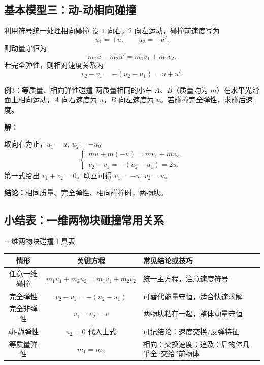 \documentclass[a4paper,11pt]{ctexart}
\begin{document}
\subsection{基本模型三：动-动相向碰撞}

\begin{conceptbox}{利用符号统一处理相向碰撞}
设 $1$ 向右，$2$ 向左运动，碰撞前速度写为
\[
  u_1 = +u,\qquad u_2 = -u'.
\]
则动量守恒为
\[
  m_1u - m_2u' = m_1v_1 + m_2v_2.
\]
若完全弹性，则相对速度关系为
\[
  v_2 - v_1 = -(u_2 - u_1) = u + u' .
\]
\end{conceptbox}

\begin{examplebox}{例3：等质量、相向弹性碰撞}
两质量相同的小车 $A$、$B$（质量均为 $m$）在水平光滑面上相向运动，$A$ 向右速度为 $u$，$B$ 向左速度为 $u$。若碰撞完全弹性，求碰后速度。

\textbf{解：}\par
取向右为正，$u_1 = u,\ u_2 = -u$。
\[
  \begin{cases}
    mu + m(-u) = mv_1 + mv_2,\\[0.3em]
    v_2 - v_1 = -(u_2 - u_1) = 2u.
  \end{cases}
\]
第一式给出 $v_1 + v_2 = 0$。联立可得 $v_1 = -u,\ v_2 = u$。\par
\textbf{结论：}相同质量、完全弹性、相向碰撞时，两物块。
\end{examplebox}

\subsection{小结表：一维两物块碰撞常用关系}

\begin{summarybox}{一维两物块碰撞工具表}
\begin{center}
\begin{tabular}{ccl}
\hline
情形 & 关键方程 & 常见结论或技巧 \\
\hline
任意一维碰撞 &
$m_1u_1 + m_2u_2 = m_1v_1 + m_2v_2$ &
统一主方程，注意速度符号 \\
完全弹性 &
$v_2 - v_1 = -(u_2 - u_1)$ &
可替代能量守恒，适合快速求解 \\
完全非弹性 &
$v_1 = v_2 = v$ &
两物块粘在一起，整体动量守恒 \\
动-静弹性 &
$u_2=0$ 代入上式 &
可记结论：速度交换/反弹特征 \\
等质量弹性 &
$m_1 = m_2$ &
相向：交换速度；追及：后物体几乎全“交给”前物体 \\
\hline
\end{tabular}
\end{center}
\end{summarybox}
\end{document}

